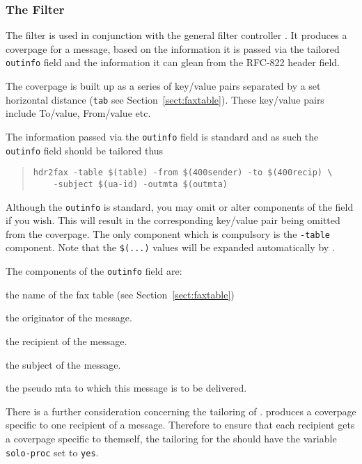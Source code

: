 \subsubsection {The  Filter}

The  filter is used in conjunction with the general
filter controller .
It produces a coverpage for a message, based on the information it is
passed via the tailored \verb+outinfo+ field and the information it
can glean from the RFC-822 header field.

The coverpage is built up as a series of key/value pairs separated by
a set horizontal distance (\verb+tab+ see Section~\ref{sect:faxtable}).
These key/value pairs include To/value, From/value etc.

The information passed via the \verb+outinfo+ field is standard and
as such the \verb+outinfo+ field should be tailored thus
\begin{quote}\begin{verbatim}
hdr2fax -table $(table) -from $(400sender) -to $(400recip) \
	-subject $(ua-id) -outmta $(outmta)
\end{verbatim}\end{quote}

Although the \verb+outinfo+ is standard, you may omit or alter components
of the field if you wish.
This will result in the corresponding key/value pair being omitted
from the coverpage.
The only component which is compulsory is the \verb+-table+ component.
Note that the \verb+$(...)+ values will be expanded automatically by
\pgm{fcontrol}.

The components of the \verb+outinfo+ field are:
\begin{describe}
\item[\verb+-table+:] the name of the fax table (see
Section~\ref{sect:faxtable})
\item[\verb+-from+:] the originator of the message.
\item[\verb+-to+:] the recipient of the message.
\item[\verb+-subject+:] the subject of the message.
\item[\verb+-outmta+:] the pseudo mta to which this message is to be
delivered.
\end{describe}

There is a further consideration concerning the tailoring of
.
\pgm{hdr2fax} produces a coverpage specific to one recipient of a message.
Therefore to ensure that each recipient gets a coverpage specific to
themself, the tailoring for the \pgm{hdr2fax} should have the variable
\verb+solo-proc+ set to \verb+yes+.

